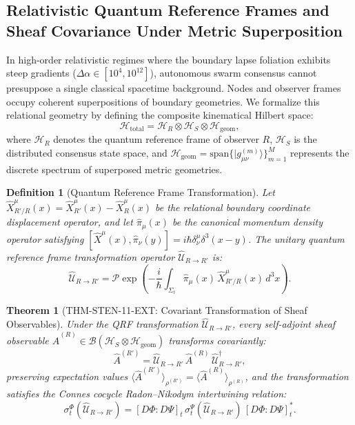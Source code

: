 \documentclass[11pt,onecolumn]{article}
\newtheorem{theorem}{Theorem}
\newtheorem{definition}{Definition}
\begin{document}
\FloatBarrier
\subsection{Relativistic Quantum Reference Frames and Sheaf Covariance Under Metric Superposition}
\label{sec:qrf_covariance}

In high-order relativistic regimes where the boundary lapse foliation exhibits steep gradients ($\Delta\alpha \in [10^4, 10^{12}]$), autonomous swarm consensus cannot presuppose a single classical spacetime background. Nodes and observer frames occupy coherent superpositions of boundary geometries. We formalize this relational geometry by defining the composite kinematical Hilbert space:
\begin{equation}
    \mathcal{H}_{\mathrm{total}} = \mathcal{H}_R \otimes \mathcal{H}_S \otimes \mathcal{H}_{\mathrm{geom}},
\end{equation}
where $\mathcal{H}_R$ denotes the quantum reference frame of observer $R$, $\mathcal{H}_S$ is the distributed consensus state space, and $\mathcal{H}_{\mathrm{geom}} = \mathrm{span}\{|g_{\mu\nu}^{(m)}\rangle\}_{m=1}^M$ represents the discrete spectrum of superposed metric geometries.

\begin{definition}[Quantum Reference Frame Transformation]
Let $\hat{X}^\mu_{R'/R}(x) = \hat{X}^\mu_{R'}(x) - \hat{X}^\mu_R(x)$ be the relational boundary coordinate displacement operator, and let $\hat{\pi}_\mu(x)$ be the canonical momentum density operator satisfying $[\hat{X}^\mu(x), \hat{\pi}_\nu(y)] = i\hbar \delta^\mu_\nu \delta^3(x - y)$. The unitary quantum reference frame transformation operator $\hat{\mathcal{U}}_{R \to R'}$ is:
\begin{equation}
    \hat{\mathcal{U}}_{R \to R'} = \mathcal{P} \exp \left( - \frac{i}{\hbar} \int_{\Sigma_t} \hat{\pi}_\mu(x) \, \hat{X}^\mu_{R'/R}(x) \, d^3x \right).
    \label{eq:qrf_unitary_def}
\end{equation}
\end{definition}

\begin{theorem}[THM-STEN-11-EXT: Covariant Transformation of Sheaf Observables]
\label{thm:sten_11_ext}
Under the QRF transformation $\hat{\mathcal{U}}_{R \to R'}$, every self-adjoint sheaf observable $\hat{A}^{(R)} \in \mathcal{B}(\mathcal{H}_S \otimes \mathcal{H}_{\mathrm{geom}})$ transforms covariantly:
\begin{equation}
    \hat{A}^{(R')} = \hat{\mathcal{U}}_{R \to R'} \, \hat{A}^{(R)} \, \hat{\mathcal{U}}_{R \to R'}^\dagger,
\end{equation}
preserving expectation values $\langle \hat{A}^{(R')} \rangle_{\rho^{(R')}} = \langle \hat{A}^{(R)} \rangle_{\rho^{(R)}}$, and the transformation satisfies the Connes cocycle Radon--Nikodym intertwining relation:
\begin{equation}
    \sigma_t^\Phi(\hat{\mathcal{U}}_{R \to R'}) = [D\Phi : D\Psi]_t \, \sigma_t^\Psi(\hat{\mathcal{U}}_{R \to R'}) \, [D\Phi : D\Psi]_t^*.
\end{equation}
\end{theorem}
\end{document}
